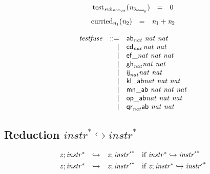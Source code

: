\documentclass[a4paper]{scrartcl}
\begin{document}
$$
\begin{array}{@{}lcl@{}l@{}}
{\mathrm{test}}_{{\mathit{sub}}_{{\mathsf{atom}}_{{22}}}}({\mathit{n}}_{{3}_{{\mathsf{atom}}_{{\mathit{y}}}}}) &=& 0 &  \\
\end{array}
$$
$$
\begin{array}{@{}lcl@{}l@{}}
{{\mathrm{curried}}}_{{\mathit{n}}_{{1}}}({\mathit{n}}_{{2}}) &=& {\mathit{n}}_{{1}} + {\mathit{n}}_{{2}} &  \\
\end{array}
$$

$$
\begin{array}{@{}l@{}rrl@{}l@{}}
& {\mathit{testfuse}} &::=& {\mathsf{ab}}_{{\mathit{nat}}}\,\,{\mathit{nat}}~{\mathit{nat}} \\ &&|&
{\mathsf{cd}}_{{\mathit{nat}}}\,{\mathit{nat}}~{\mathit{nat}} \\ &&|&
{\mathsf{ef\_}}{{\mathit{nat}}}~{\mathit{nat}}~{\mathit{nat}} \\ &&|&
{{\mathsf{gh}}_{{\mathit{nat}}}}{{\mathit{nat}}}~{\mathit{nat}} \\ &&|&
{{\mathsf{ij}}_{{\mathit{nat}}}}{{\mathit{nat}}}~{\mathit{nat}} \\ &&|&
{\mathsf{kl\_ab}}{{\mathit{nat}}}~{\mathit{nat}}~{\mathit{nat}} \\ &&|&
{\mathsf{mn\_}}{\mathsf{ab}}~{\mathit{nat}}~{\mathit{nat}}~{\mathit{nat}} \\ &&|&
{{\mathsf{op\_}}{\mathsf{ab}}}{{\mathit{nat}}}~{\mathit{nat}}~{\mathit{nat}} \\ &&|&
{{\mathsf{qr}}_{{\mathit{nat}}}}{\mathsf{ab}}~{\mathit{nat}}~{\mathit{nat}} \\
\end{array}
$$


\subsection*{Reduction $\boxed{{{{\mathit{instr}}}^\ast} \hookrightarrow {{{\mathit{instr}}}^\ast}}$}

$$
\begin{array}{@{}l@{}lcl@{}l@{}}
& {\mathit{z}} ; {{\mathit{instr}}^\ast} &\hookrightarrow& {\mathit{z}} ; {{\mathit{instr}'}^\ast} &\quad
  \mbox{if}~{{\mathit{instr}}^\ast} \hookrightarrow {{\mathit{instr}'}^\ast} \\[0.8ex]
& {\mathit{z}} ; {{\mathit{instr}}^\ast} &\hookrightarrow& {\mathit{z}} ; {{\mathit{instr}'}^\ast} &\quad
  \mbox{if}~{\mathit{z}} ; {{\mathit{instr}}^\ast} \hookrightarrow {{\mathit{instr}'}^\ast} \\
\end{array}
$$
\end{document}
